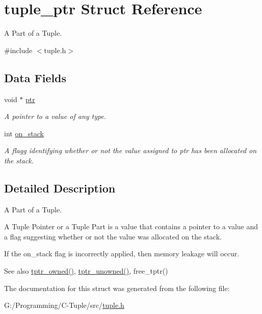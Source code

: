\hypertarget{structtuple__ptr}{}\section{tuple\+\_\+ptr Struct Reference}
\label{structtuple__ptr}


A Part of a Tuple.  




{\ttfamily \#include $<$tuple.\+h$>$}

\subsection*{Data Fields}
\begin{DoxyCompactItemize}
\item 
void $\ast$ \hyperlink{structtuple__ptr_add9af9569af79ec26dd741fb226b38ba}{ptr}\hypertarget{structtuple__ptr_add9af9569af79ec26dd741fb226b38ba}{}\label{structtuple__ptr_add9af9569af79ec26dd741fb226b38ba}

\begin{DoxyCompactList}\small\item\em A pointer to a value of any type. \end{DoxyCompactList}\item 
int \hyperlink{structtuple__ptr_a5b5a4edd9167c9c2937631f949963954}{on\+\_\+stack}\hypertarget{structtuple__ptr_a5b5a4edd9167c9c2937631f949963954}{}\label{structtuple__ptr_a5b5a4edd9167c9c2937631f949963954}

\begin{DoxyCompactList}\small\item\em A flagg identifying whether or not the value assigned to ptr has been allocated on the stack. \end{DoxyCompactList}\end{DoxyCompactItemize}


\subsection{Detailed Description}
A Part of a Tuple. 

A Tuple Pointer or a Tuple Part is a value that contains a pointer to a value and a flag suggesting whether or not the value was allocated on the stack.

If the on\+\_\+stack flag is incorrectly applied, then memory leakage will occur.

\begin{DoxySeeAlso}{See also}
\hyperlink{tuple_8h_a686c6e334af297fc6fc23540cb13dfc4}{tptr\+\_\+owned()}, \hyperlink{tuple_8h_a27c87c74b11c1f626599143ab6f69859}{tptr\+\_\+unowned()}, free\+\_\+tptr() 
\end{DoxySeeAlso}


The documentation for this struct was generated from the following file\+:\begin{DoxyCompactItemize}
\item 
G\+:/\+Programming/\+C-\/\+Tuple/src/\hyperlink{tuple_8h}{tuple.\+h}\end{DoxyCompactItemize}
